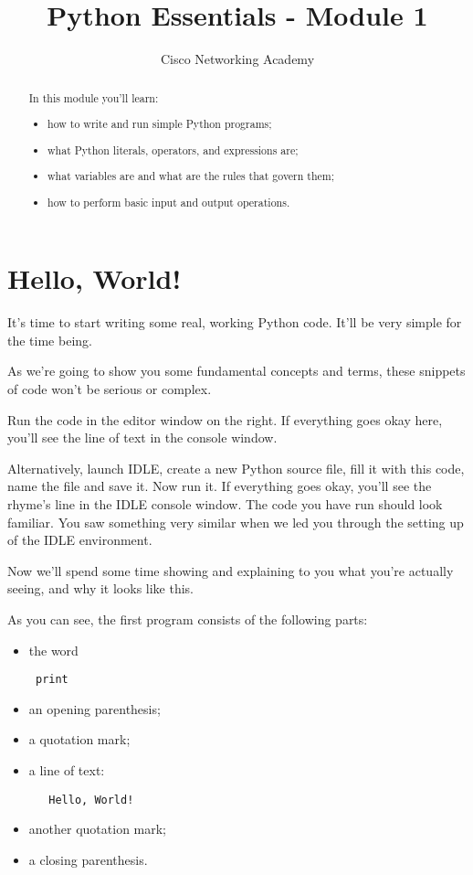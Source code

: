 \documentclass[a4paper,10pt]{article}
\title{Python Essentials - Module 1}
\author{Cisco Networking Academy}
\begin{document}
\maketitle{}
\begin{abstract}
In this module you'll learn:
\begin{itemize}
 \item how to write and run simple Python programs;
 \item what Python literals, operators, and expressions are;
 \item what variables are and what are the rules that govern them;
 \item how to perform basic input and output operations.
\end{itemize}
\end{abstract}
\section{Hello, World!}
It's time to start writing some real, working Python code. It'll be very simple for the time being.
\newline

As we're going to show you some fundamental concepts and terms, these snippets of code won't be serious or complex.
\newline

Run the code in the editor window on the right. If everything goes okay here, you'll see the line of text in the console window.
\newline

Alternatively, launch IDLE, create a new Python source file, fill it with this code, name the file and save it. Now run it. If everything goes okay, you'll see the rhyme's line in the IDLE console window. The code you have run should look familiar. You saw something very similar when we led you through the setting up of the IDLE environment.
\newline

Now we'll spend some time showing and explaining to you what you're actually seeing, and why it looks like this.
\newline

As you can see, the first program consists of the following parts:
\begin{itemize}
 \item the word
 \begin{verbatim}
 print
 \end{verbatim}
 \item an opening parenthesis;
 \item a quotation mark;
 \item a line of text:
  \begin{verbatim}
   Hello, World!
  \end{verbatim}
 \item another quotation mark;
 \item a closing parenthesis.
\end{itemize}
\end{document}
